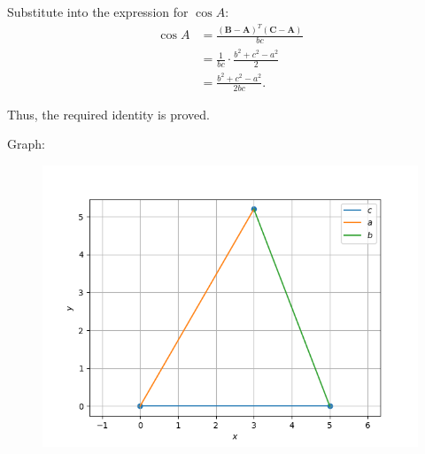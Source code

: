 \documentclass{beamer}
\theoremstyle{remark}
\let\vec\mathbf
\numberwithin{equation}{section}
\begin{document}
Substitute into the expression for \(\cos A\):
\begin{align}
\cos A &= \frac{(\vec{B} - \vec{A})^T (\vec{C} - \vec{A})}{bc} \\
       &= \frac{1}{bc} \cdot \frac{b^2 + c^2 - a^2}{2} \\
       &= \frac{b^2 + c^2 - a^2}{2bc}.
\end{align}

Thus, the required identity is proved.

		

Graph:
\begin{figure}[H]
    \centering
    \includegraphics[scale=0.5]{plot}
    \caption{}
    \label{fig:plot}
\end{figure}
\end{document}
